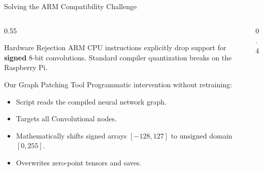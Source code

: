 \documentclass[aspectratio=169,11pt]{beamer}
\begin{document}
\begin{frame}{Solving the ARM Compatibility Challenge}
\begin{columns}
\begin{column}{0.55\textwidth}
\begin{alertblock}{Hardware Rejection}
ARM CPU instructions explicitly drop support for \textbf{signed} 8-bit convolutions. Standard compiler quantization breaks on the Raspberry Pi.
\end{alertblock}

\vspace{0.3em}

\begin{exampleblock}{Our Graph Patching Tool}
Programmatic intervention without retraining:
\begin{itemize}
    \item Script reads the compiled neural network graph.
    \item Targets all Convolutional nodes.
    \item Mathematically shifts signed arrays $[-128, 127]$ to unsigned domain $[0, 255]$.
    \item Overwrites zero-point tensors and saves.
\end{itemize}
\end{exampleblock}
\end{column}
\begin{column}{0.4\textwidth}
\centering
{}
\end{column}
\end{columns}
\end{frame}
\end{document}
